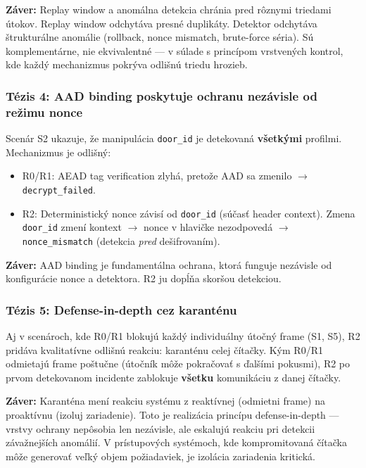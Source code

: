 \textbf{Záver:} Replay window a anomálna detekcia chránia pred rôznymi triedami útokov. Replay window odchytáva presné duplikáty. Detektor odchytáva štrukturálne anomálie (rollback, nonce mismatch, brute-force séria). Sú komplementárne, nie ekvivalentné --- v súlade s princípom vrstvených kontrol, kde každý mechanizmus pokrýva odlišnú triedu hrozieb\cite{NIST80053,DefenseInDepth}.

\subsubsection{Tézis 4: AAD binding poskytuje ochranu nezávisle od režimu nonce}

Scenár S2 ukazuje, že manipulácia \texttt{door\_id} je detekovaná \textbf{všetkými} profilmi. Mechanizmus je odlišný:
\begin{itemize}[leftmargin=*,itemsep=2pt]
  \item R0/R1: AEAD tag verification zlyhá, pretože AAD sa zmenilo $\rightarrow$ \texttt{decrypt\_failed}.
  \item R2: Deterministický nonce závisí od \texttt{door\_id} (súčasť header context). Zmena \texttt{door\_id} zmení kontext $\rightarrow$ nonce v hlavičke nezodpovedá $\rightarrow$ \texttt{nonce\_mismatch} (detekcia \emph{pred} dešifrovaním).
\end{itemize}

\textbf{Záver:} AAD binding je fundamentálna ochrana, ktorá funguje nezávisle od konfigurácie nonce a detektora. R2 ju dopĺňa skoršou detekciou.

\subsubsection{Tézis 5: Defense-in-depth cez karanténu}

Aj v scenároch, kde R0/R1 blokujú každý individuálny útočný frame (S1, S5), R2 pridáva kvalitatívne odlišnú reakciu: karanténu celej čítačky. Kým R0/R1 odmietajú frame poštučne (útočník môže pokračovať s ďalšími pokusmi), R2 po prvom detekovanom incidente zablokuje \textbf{všetku} komunikáciu z danej čítačky.

\textbf{Záver:} Karanténa mení reakciu systému z reaktívnej (odmietni frame) na proaktívnu (izoluj zariadenie). Toto je realizácia princípu defense-in-depth\cite{DefenseInDepth} --- vrstvy ochrany nepôsobia len nezávisle, ale eskalujú reakciu pri detekcii závažnejších anomálií. V prístupových systémoch, kde kompromitovaná čítačka môže generovať veľký objem požiadaviek, je izolácia zariadenia kritická\cite{NIST80094}.

